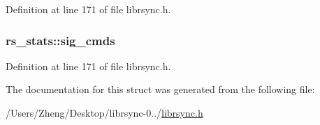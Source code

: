 Definition at line 171 of file librsync.\+h.

\hypertarget{structrs__stats_ae0089977b2e626379ace74995402f771}{}
\subsubsection[{sig\+\_\+cmds}]{ rs\+\_\+stats\+::sig\+\_\+cmds}\label{structrs__stats_ae0089977b2e626379ace74995402f771}


Definition at line 171 of file librsync.\+h.



The documentation for this struct was generated from the following file\+:\begin{DoxyCompactItemize}
\item 
/\+Users/\+Zheng/\+Desktop/librsync-\/0../\hyperlink{librsync_8h}{librsync.\+h}\end{DoxyCompactItemize}
